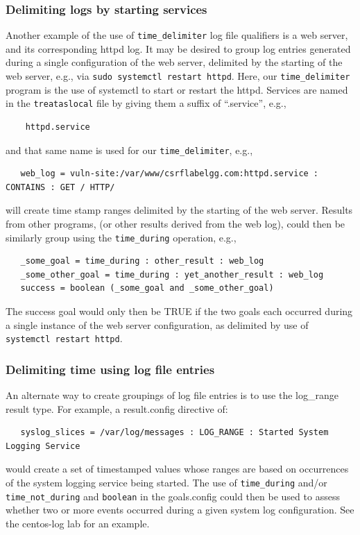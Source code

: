 \documentclass[12pt]{article}
\begin{document}
\subsubsection{Delimiting logs by starting services}
\label{time delimiter services}
Another example of the use of {\tt time\_delimiter} log file qualifiers is a web server,
and its corresponding httpd log.  It may be desired to group log entries generated during a
single configuration of the web server, delimited by the starting of the web server, e.g., via
{\tt sudo systemctl restart httpd}.  Here, our {\tt time\_delimiter} program is the use of systemctl
to start or restart the httpd.  Services are named in the {\tt treataslocal} file by giving them a
suffix of ``.service'', e.g.,
\begin{verbatim}
    httpd.service
\end{verbatim}
\noindent and that same name is used for our {\tt time\_delimiter}, e.g.,
\begin{verbatim}
   web_log = vuln-site:/var/www/csrflabelgg.com:httpd.service : CONTAINS : GET / HTTP/
\end{verbatim} 
\noindent will create time stamp ranges delimited by the starting of the web server.  Results from
other programs, (or other results derived from the web log), could then be similarly group using 
the {\tt time\_during} operation, e.g.,
\begin{verbatim}
   _some_goal = time_during : other_result : web_log
   _some_other_goal = time_during : yet_another_result : web_log
   success = boolean (_some_goal and _some_other_goal) 
\end{verbatim}
The success goal would only then be TRUE if the two goals each occurred during a single instance
of the web server configuration, as delimited by use of {\tt systemctl restart httpd}.

\subsubsection{Delimiting time using log file entries}
An alternate way to create groupings of log file entries is to use the log\_range 
result type. For example, a result.config directive of:
\begin{verbatim}  
   syslog_slices = /var/log/messages : LOG_RANGE : Started System Logging Service
\end{verbatim}
\noindent would create a set of timestamped values whose ranges are based on occurrences
of the system logging service being started.  The use of {\tt time\_during}
and/or {\tt time\_not\_during} and {\tt boolean} in the goals.config could then be used to assess whether
two or more events occurred during a given system log configuration.  See the centos-log lab
for an example. 
\end{document}
